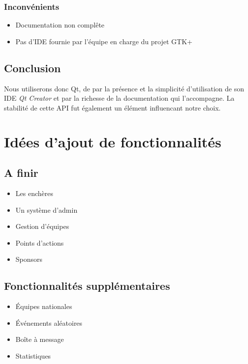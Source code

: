 \documentclass[a4paper]{report}
\begin{document}
\subsection{Inconvénients}
\begin{itemize}
    \item Documentation non complête
    \item Pas d'IDE fournie par l'équipe en charge du projet GTK+
\end{itemize}
\section{Conclusion}
Nous utiliserons donc Qt, de par la présence et la simplicité d'utilisation de son IDE \textit{Qt Creator} et par la richesse de la documentation qui l'accompagne. La stabilité de cette API fut également un élément influencant notre choix.

\chapter{Idées d'ajout de fonctionnalités}
\section{A finir}
\begin{itemize}
    \item Les enchères
    \item Un système d'admin
    \item Gestion d'équipes
    \item Points d'actions
    \item Sponsors
\end{itemize}
\section {Fonctionnalités supplémentaires}
\begin{itemize}
    \item Équipes nationales
    \item Événements aléatoires
    \item Boîte à message
    \item Statistiques
\end{itemize}



\printindex
\listoffigures
\end{document}
